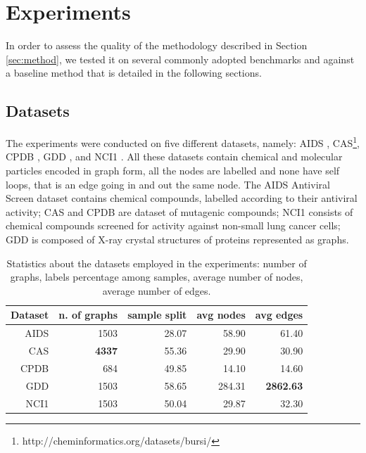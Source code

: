 
\chapter{Experiments}
\label{Chapter4}

In order to assess the quality of the methodology described in Section \ref{sec:method},
we tested it on several commonly adopted benchmarks and against a baseline method
that is detailed in the following sections.

\section{Datasets}
\label{subsec:datasets}

The experiments were conducted on five different datasets, namely:
AIDS \cite{Weislow19041989}, CAS\footnote{http://cheminformatics.org/datasets/bursi/},
CPDB \cite{journals/jcisd/HelmaCKR04}, GDD \cite{dobson2003}, and NCI1 \cite{journals/kais/WaleWK08}.
All these datasets contain chemical and molecular particles encoded in graph form,
all the nodes are labelled and none have self loops, that is an edge going in and 
out the same node.
The AIDS Antiviral Screen dataset contains chemical compounds, labelled according to
their antiviral activity; CAS and CPDB are dataset of mutagenic
compounds; NCI1 consists of chemical compounds screened for activity against 
non-small lung cancer cells; GDD is composed of X-ray crystal structures of
proteins represented as graphs.
    \begin{table}[ht]
        \centering
        \begin{tabular}{|r|r|r|r|r|}
            \hline
            Dataset & n. of graphs & sample split & avg nodes & avg edges \\ \hline
            AIDS    & 1503         & 28.07        & 58.90     & 61.40     \\ \hline      
            CAS     & \textbf{4337} & 55.36        & 29.90     & 30.90     \\ \hline      
            CPDB    &  684         & 49.85        & 14.10     & 14.60     \\ \hline      
            GDD     & 1503         & 58.65        & 284.31    & \textbf{2862.63}   \\ \hline      
            NCI1    & 1503         & 50.04        & 29.87     & 32.30     \\ \hline      
        \end{tabular}
        \caption{Statistics about the datasets employed in the experiments: number
        of graphs, labels percentage among samples, average number of nodes, average
        number of edges.}
        \label{table:datasets}
    \end{table}

